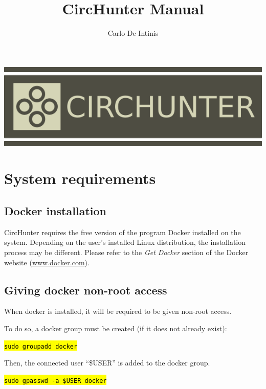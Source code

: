 \documentclass[letterpaper,12pt]{article}
\newcommand{\code}[1]{\hl{\texttt{#1}}}
\begin{document}
\title{CircHunter Manual}
\author{Carlo De Intinis}

\maketitle

\begin{center}
\includegraphics[width=\textwidth]{circhunter_logo.png}
\end{center}

\tableofcontents
\newpage

\section{System requirements}
\subsection{Docker installation}
CircHunter requires the free version of the program Docker installed on the system. Depending on the user's installed Linux distribution, the installation process may be different. Please refer to the \textit{Get Docker} section of the Docker website (\href{http://www.docker.com}{www.docker.com}).

\subsection{Giving docker non-root access}

When docker is installed, it will be required to be given non-root access.

To do so, a docker group must be created (if it does not already exist):

\bigskip

\noindent\code{sudo groupadd docker}

\bigskip

Then, the connected user ``\$USER'' is added to the docker group.

\bigskip

\noindent\code{sudo gpasswd -a \$USER docker}
\end{document}
